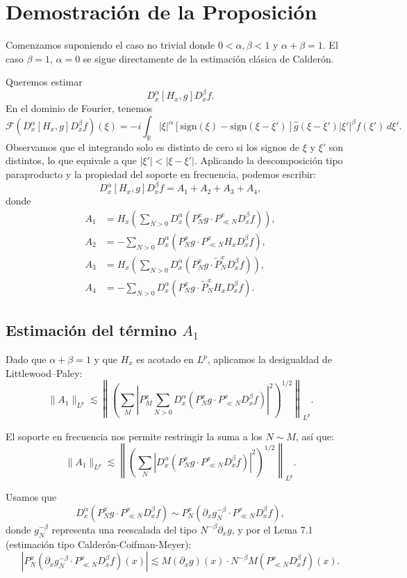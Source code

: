 \documentclass{aleph-revista}
\renewcommand{\hat}{\widehat}
\begin{document}
\section{Demostración de la Proposición}

Comenzamos suponiendo el caso no trivial donde $0 < \alpha, \beta < 1$ y $\alpha + \beta = 1$. El caso $\beta = 1$, $\alpha = 0$ se sigue directamente de la estimación clásica de Calderón.

Queremos estimar
\[
D_x^\alpha [H_x, g] D_x^\beta f.
\]
En el dominio de Fourier, tenemos
\[
\mathcal{F} \left( D_x^\alpha [H_x, g] D_x^\beta f \right)(\xi) = -i \int_{\mathbb{R}} |\xi|^\alpha \left[ \mathrm{sign}(\xi) - \mathrm{sign}(\xi - \xi') \right] \hat{g}(\xi - \xi') |\xi'|^\beta \hat{f}(\xi') \, d\xi'.
\]
Observamos que el integrando solo es distinto de cero si los signos de $\xi$ y $\xi'$ son distintos, lo que equivale a que $|\xi'| < |\xi - \xi'|$.
Aplicando la descomposici\'on tipo paraproducto y la propiedad del soporte en frecuencia, podemos escribir:
\[
D_x^\alpha [H_x, g] D_x^\beta f = A_1 + A_2 + A_3 + A_4,
\]
donde
\begin{align*}
A_1 &= H_x \left( \sum_{N>0} D_x^\alpha (P_N^x g \cdot P_{\ll N}^x D_x^\beta f) \right), \\
A_2 &= - \sum_{N>0} D_x^\alpha (P_N^x g \cdot P_{\ll N}^x H_x D_x^\beta f), \\
A_3 &= H_x \left( \sum_{N>0} D_x^\alpha (P_N^x g \cdot \widetilde{P}_N^x D_x^\beta f) \right), \\
A_4 &= - \sum_{N>0} D_x^\alpha (P_N^x g \cdot \widetilde{P}_N^x H_x D_x^\beta f).
\end{align*}

\subsection*{Estimaci\'on del t\'ermino $A_1$}

Dado que $\alpha + \beta = 1$ y que $H_x$ es acotado en $L^p$, aplicamos la desigualdad de Littlewood--Paley:
\[
\|A_1\|_{L^p} \lesssim \left\| \left( \sum_{M} |P_M^x \sum_{N > 0} D_x^\alpha (P_N^x g \cdot P_{\ll N}^x D_x^\beta f)|^2 \right)^{1/2} \right\|_{L^p}.
\]

El soporte en frecuencia nos permite restringir la suma a los \( N \sim M \), as\'i que:
\[
\|A_1\|_{L^p} \lesssim \left\| \left( \sum_{N} |D_x^\alpha (P_N^x g \cdot P_{\ll N}^x D_x^\beta f)|^2 \right)^{1/2} \right\|_{L^p}.
\]

Usamos que
\[
D_x^\alpha (P_N^x g \cdot P_{\ll N}^x D_x^\beta f) \sim P_N^x (\partial_x g_N^{-\beta} \cdot P_{\ll N}^x D_x^\beta f),
\]
donde \( g_N^{-\beta} \) representa una reescalada del tipo \( N^{-\beta} \partial_x g \), y por el Lema 7.1 (estimaci\'on tipo Calder\'on-Coifman-Meyer):
\[
|P_N^x (\partial_x g_N^{-\beta} \cdot P_{\ll N}^x D_x^\beta f)(x)| \lesssim M(\partial_x g)(x) \cdot N^{-\beta} M(P_{\ll N}^x D_x^\beta f)(x).
\]
\end{document}
